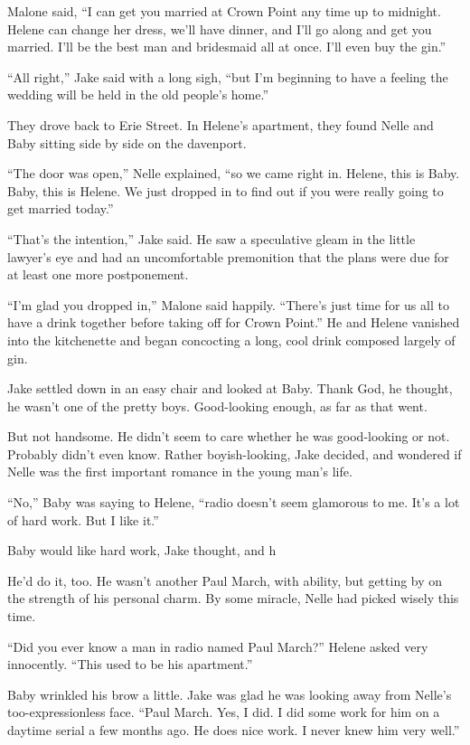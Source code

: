 \documentclass{novel}
\begin{document}
Malone said, “I can get you married at Crown Point any time up to midnight. Helene can change her dress, we’ll have dinner, and I’ll go along and get you married. I’ll be the best man and bridesmaid all at once. I'll even buy the gin.”

“All right,” Jake said with a long sigh, “but I’m beginning to have a feeling the wedding will be held in the old people’s home.”

They drove back to Erie Street. In Helene’s apartment, they found Nelle and Baby sitting side by side on the davenport.

“The door was open,” Nelle explained, “so we came right in. Helene, this is Baby. Baby, this is Helene. We just dropped in to find out if you were really going to get married today.”

“That’s the intention,” Jake said. He saw a speculative gleam in the little lawyer’s eye and had an uncomfortable premonition that the plans were due for at least one more postponement.

“I’m glad you dropped in,” Malone said happily. “There’s just time for us all to have a drink together before taking off for Crown Point.” He and Helene vanished into the kitchenette and began concocting a long, cool drink composed largely of gin.

Jake settled down in an easy chair and looked at Baby. Thank God, he thought, he wasn’t one of the pretty boys. Good-looking enough, as far as that went.

But not handsome. He didn’t seem to care whether he was good-looking or not. Probably didn’t even know. Rather boyish-looking, Jake decided, and wondered if Nelle was the first important romance in the young man’s life.

“No,” Baby was saying to Helene, “radio doesn’t seem glamorous to me. It’s a lot of hard work. But I like it.”

Baby would like hard work, Jake thought, and h

He’d do it, too. He wasn’t another Paul March, with ability, but getting by on the strength of his personal charm. By some miracle, Nelle had picked wisely this time.

“Did you ever know a man in radio named Paul March?” Helene asked very innocently. “This used to be his apartment.”

Baby wrinkled his brow a little. Jake was glad he was looking away from Nelle’s too-expressionless face. “Paul March. Yes, I did. I did some work for him on a daytime serial a few months ago. He does nice work. I never knew him very well.”
\end{document}
